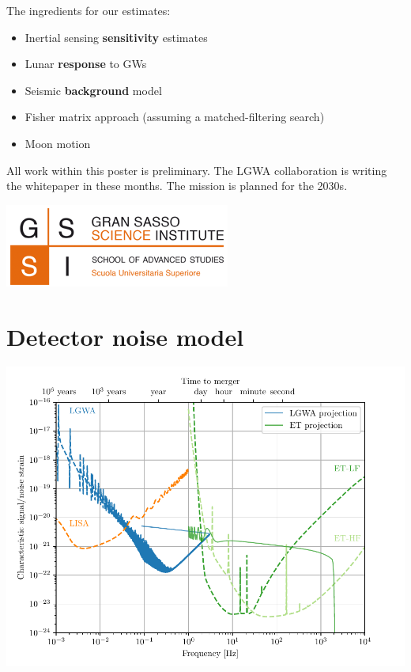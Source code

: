 \documentclass[a0paper,fleqn]{betterposter}
\begin{document}
{The ingredients for our estimates:
\begin{itemize}
    \item Inertial sensing \textbf{sensitivity} estimates
    \item Lunar \textbf{response} to GWs
    \item Seismic \textbf{background} model
    \item Fisher matrix approach (assuming a matched-filtering search)
    \item Moon motion
\end{itemize}

\vfill
All work within this poster is preliminary.
The LGWA collaboration is writing the whitepaper in these months.
The mission is planned for the 2030s.
\vspace{5mm}

\begin{center}
    \includegraphics[width=.8\textwidth]{img/logo-gssi-new.png}\\
\end{center}

}{
\section{Detector noise model}
\includegraphics[width=\textwidth]{../plots/sensitivity_curves.pdf}
}
\end{document}
